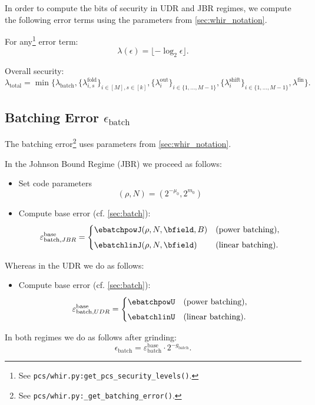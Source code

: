 In order to compute the bits of security in UDR and JBR regimes, we compute the following error terms using the parameters from \cref{sec:whir_notation}.

For any\footnote{See \texttt{pcs/whir.py:get\_pcs\_security\_levels()}.} error term:
\[
  \lambda(\epsilon)
  = \lfloor-\log_2\epsilon\rfloor.
\]

Overall security:
\[
  \lambda_{\mathrm{total}}
    = \min\{
      \lambda_{\mathrm{batch}},
      \{\lambda^{\mathrm{fold}}_{i,s}\}_{i\in [M],s\in[k]},
      \{\lambda^{\mathrm{out}}_i\}_{i\in \{1,\ldots,M-1\}},
      \{\lambda^{\mathrm{shift}}_i\}_{i\in \{1,\ldots,M-1\}},
      \lambda^{\mathrm{fin}}
    \}.
\]

\subsection{Batching Error \(\epsilon_{\mathrm{batch}}\)}

The batching error\footnote{See \texttt{pcs/whir.py:\_get\_batching\_error()}.} uses parameters from \cref{sec:whir_notation}.

In the Johnson Bound Regime (JBR) we proceed as follows:
\begin{itemize}
    \item Set code parameters $$
    (\rho,N)= \left(2^{-\mu_0}, 2^{m_0}\right)
    $$
    \item Compute base error (cf. \cref{sec:batch}):
\[
\varepsilon_{\mathrm{batch}, JBR}^{\text{base}} =
\begin{cases}
   \ebatchpowJ(\rho,N,\bfield,B) & \text{(power batching)}, \\[4pt]
  \ebatchlinJ(\rho,N,\bfield)& \text{(linear batching)}.
\end{cases}
\]
\end{itemize}
Whereas in the UDR we do as follows:
\begin{itemize}
    \item Compute base error (cf. \cref{sec:batch}):
\[
\varepsilon_{\mathrm{batch}, UDR}^{\text{base}} =
\begin{cases}
   \ebatchpowU & \text{(power batching)}, \\[4pt]
  \ebatchlinU& \text{(linear batching)}.
\end{cases}
\]
\end{itemize}

In both regimes we do as follows after grinding:
\[
  \epsilon_{\mathrm{batch}}
  = \varepsilon_{\mathrm{batch}}^{\text{base}}
    \cdot 2^{-g_{\mathrm{batch}}}.
\]
